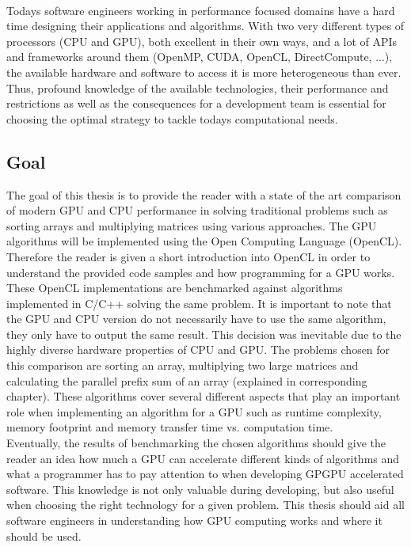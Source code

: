 \\
Todays software engineers working in performance focused domains have a hard time designing their applications and algorithms. With two very different types of processors (CPU and GPU), both excellent in their own ways, and a lot of APIs and frameworks around them (OpenMP, CUDA, OpenCL, DirectCompute, ...), the available hardware and software to access it is more heterogeneous than ever. Thus, profound knowledge of the available technologies, their performance and restrictions as well as the consequences for a development team is essential for choosing the optimal strategy to tackle todays computational needs.

\subsection{Goal}
The goal of this thesis is to provide the reader with a state of the art comparison of modern GPU and CPU performance in solving traditional problems such as sorting arrays and multiplying matrices using various approaches.
The GPU algorithms will be implemented using the Open Computing Language (OpenCL). Therefore the reader is given a short introduction into OpenCL in order to understand the provided code samples and how programming for a GPU works. These OpenCL implementations are benchmarked against algorithms implemented in C/C++ solving the same problem. It is important to note that the GPU and CPU version do not necessarily have to use the same algorithm, they only have to output the same result. This decision was inevitable due to the highly diverse hardware properties of CPU and GPU.
The problems chosen for this comparison are sorting an array, multiplying two large matrices and calculating the parallel prefix sum of an array (explained in corresponding chapter). These algorithms cover several different aspects that play an important role when implementing an algorithm for a GPU such as runtime complexity, memory footprint and memory transfer time vs. computation time. 
\\
Eventually, the results of benchmarking the chosen algorithms should give the reader an idea how much a GPU can accelerate different kinds of algorithms and what a programmer has to pay attention to when developing GPGPU accelerated software. This knowledge is not only valuable during developing, but also useful when choosing the right technology for a given problem. This thesis should aid all software engineers in understanding how GPU computing works and where it should be used.

